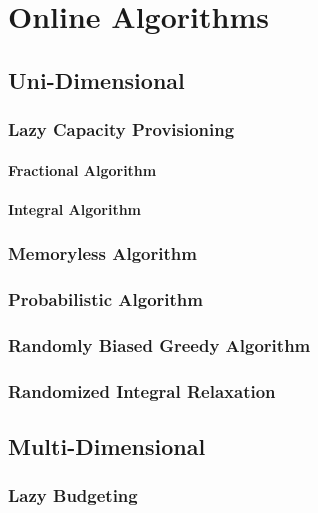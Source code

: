 
\chapter{Online Algorithms}\label{chapter:online_algorithms}

\section{Uni-Dimensional}

\subsection{Lazy Capacity Provisioning}

\subsubsection{Fractional Algorithm}

\subsubsection{Integral Algorithm}

\subsection{Memoryless Algorithm}

\subsection{Probabilistic Algorithm}

\subsection{Randomly Biased Greedy Algorithm}

\subsection{Randomized Integral Relaxation}

\section{Multi-Dimensional}

\subsection{Lazy Budgeting}

